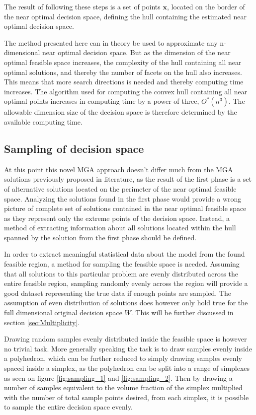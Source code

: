 The result of following these steps is a set of points $\mathbf{x}$, located on the border of the near optimal decision space, defining the hull containing the estimated near optimal decision space. 

The method presented here can in theory be used to approximate any n-dimensional near optimal decision space. But as the dimension of the near optimal feasible space increases, the complexity of the hull containing all near optimal solutions, and thereby the number of facets on the hull also increases. This means that more search directions is needed and thereby computing time increases. The algorithm used for computing the convex hull containing all near optimal points increases in computing time by a power of three, $O^*(n^3)$. The allowable dimension size of the decision space is therefore determined by the available computing time. 

\subsection{Sampling of decision space}

At this point this novel MGA approach doesn't differ much from the MGA solutions previously proposed in literature, as the result of the first phase is a set of alternative solutions located on the perimeter of the near optimal feasible space. Analyzing the solutions found in the first phase would provide a wrong picture of complete set of solutions contained in the near optimal feasible space as they represent only the extreme points of the decision space. Instead, a method of extracting information about all solutions located within the hull spanned by the solution from the first phase should be defined. 

In order to extract meaningful statistical data about the model from the found feasible region, a method for sampling the feasible space is needed. Assuming that all solutions to this particular problem are evenly distributed across the entire feasible region, sampling randomly evenly across the region will provide a good dataset representing the true data if enough points are sampled. The assumption of even distribution of solutions does however only hold true for the full dimensional original decision space $W$. This will be further discussed in section \ref{sec:Multiplicity}. 

Drawing random samples evenly distributed inside the feasible space is however no trivial task. More generally speaking the task is to draw samples evenly inside a polyhedron, which can be further reduced to simply drawing samples evenly spaced inside a simplex, as the polyhedron can be split into a range of simplexes as seen on figure \ref{fig:sampling_1} and \ref{fig:sampling_2}. Then by drawing a number of samples equivalent to the volume fraction of the simplex multiplied with the number of total sample points desired, from each simplex, it is possible to sample the entire decision space evenly. 

